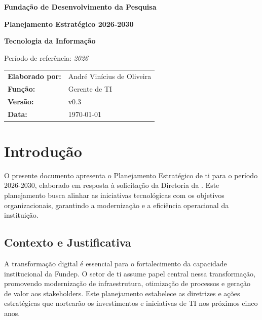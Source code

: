 \documentclass[12pt,a4paper]{article}
\newcommand{\ReportTitle}{Planejamento Estratégico 2026-2030}
\newcommand{\ReportProject}{Tecnologia da Informação}
\newcommand{\ReportOrg}{Fundação de Desenvolvimento da Pesquisa}
\newcommand{\ReportAuthor}{André Vinícius de Oliveira}
\newcommand{\ReportRole}{Gerente de TI}
\newcommand{\ReportPeriod}{\textit{2026}}
\newcommand{\ReportVersion}{v0.3}
\newcommand{\ReportDate}{\today}
\begin{document}
\begin{titlepage}
  \centering

  \vspace*{3cm}
  {\Large \textbf{\ReportOrg}\par}
  \vspace{0.8cm}
  {\huge \textbf{\ReportTitle}\par}
  \vspace{0.4cm}
  {\Large \textbf{\ReportProject}\par}
  \vspace{0.8cm}
  {\large Período de referência: \ReportPeriod \par}
  \vspace{0.8cm}
  \begin{tabular}{>{\bfseries}p{3.2cm}p{10.5cm}}
    Elaborado por: & \ReportAuthor \\
    Função:        & \ReportRole \\
    Versão:        & \ReportVersion \\
    Data:          & \ReportDate \\
  \end{tabular}

  \vfill
  \vspace*{1cm}
\end{titlepage}


\tableofcontents
\newpage

\printglossary[type=\acronymtype, title=Glossário]
\newpage

\section{Introdução}

O presente documento apresenta o Planejamento Estratégico de \gls{ti} para o período 2026-2030, elaborado em resposta à solicitação da Diretoria da . Este planejamento busca alinhar as iniciativas tecnológicas com os objetivos organizacionais, garantindo a modernização e a eficiência operacional da instituição.

\subsection{Contexto e Justificativa}

A transformação digital é essencial para o fortalecimento da capacidade institucional da Fundep. O setor de \gls{ti} assume papel central nessa transformação, promovendo modernização de infraestrutura, otimização de processos e geração de valor aos stakeholders. Este planejamento estabelece as diretrizes e ações estratégicas que nortearão os investimentos e iniciativas de TI nos próximos cinco anos.
\end{document}
